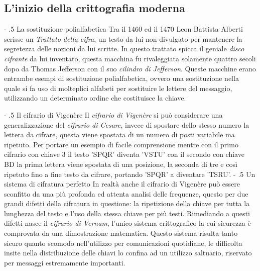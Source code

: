 \documentclass[a4paper, 12pt]{article}
\makeatletter
\renewcommand\paragraph{%
        \@startsection{paragraph}{4}{0mm}%
           {-\baselineskip}%
           {.5\baselineskip}%
           {\normalfont\normalsize\bfseries}}
\makeatother
\begin{document}
\subsection{L'inizio della crittografia moderna}
\paragraph{La sostituzione polialfabetica}
Tra il 1460 ed il 1470 Leon Battista Alberti scrisse un \textit{Trattato della cifra}, un testo da lui non divulgato per mantenere la segretezza delle nozioni da lui scritte. In questo trattato spicca il geniale \textit{disco cifrante} da lui inventato, questa macchina fu rivaleggiata solamente quattro secoli dopo da Thomas Jefferson con il suo \textit{cilindro di Jefferson}.
Queste macchine erano entrambe esempi di sostituzione polialfabetica, ovvero una sostituzione nella quale si fa uso di molteplici alfabeti per sostituire le lettere del messaggio, utilizzando un determinato ordine che costituisce la chiave.

\paragraph{Il cifrario di Vigenère}
Il \textit{cifrario di Vigenère} si può considerare una generalizzazione del \textit{cifrario di Cesare}, invece di spostare dello stesso numero la lettera da cifrare, questa viene spostata di un numero di posti variabile ma ripetuto. Per portare un esempio di facile comprensione mentre con il primo cifrario con chiave 3 il testo 'SPQR' diventa 'VSTU' con il secondo con chiave BD la prima lettera viene spostata di una posizione, la seconda di tre e così ripetuto fino a fine testo da cifrare, portando 'SPQR' a diventare 'TSRU'.
\paragraph{Un sistema di cifratura perfetto}
In realtà anche il cifrario di Vigenère può essere sconfitto da una più profonda ed attenta analisi delle frequenze, questo per due grandi difetti della cifratura in questione: la ripetizione della chiave per tutta la lunghezza del testo e l'uso della stessa chiave per più testi.\newline
Rimediando a questi difetti nasce il \textit{cifrario di Vernam}, l'unico sistema crittografico la cui sicurezza è comprovata da una dimostrazione matematica. Questo sistema risulta tanto sicuro quanto scomodo nell'utilizzo per comunicazioni quotidiane, le difficolta insite nella distribuzione delle chiavi lo confina ad un utilizzo saltuario, riservato per messaggi estremamente importanti.
\end{document}
